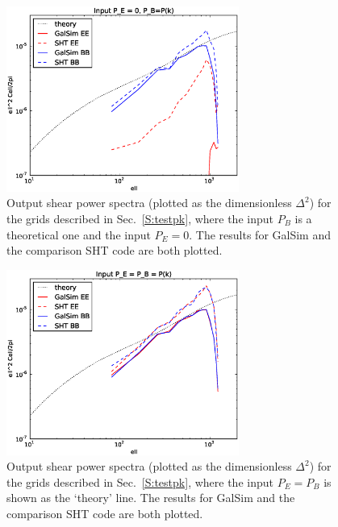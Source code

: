 \documentclass[preprint]{aastex}
\begin{document}
\begin{figure}
\begin{center}
\includegraphics[width=3in]{../external/test_gridshear/output/compare_input_pb.eps}
\caption{Output shear power spectra (plotted as the dimensionless
  $\Delta^2$) for the grids described in Sec.~\ref{S:testpk}, where
  the input $P_B$ is a theoretical one and the input $P_E=0$. The results for GalSim and the
  comparison SHT code are both plotted.\label{F:pb}}
\end{center}
\end{figure}

\begin{figure}
\begin{center}
\includegraphics[width=3in]{../external/test_gridshear/output/compare_input_peb.eps}
\caption{Output shear power spectra (plotted as the dimensionless
  $\Delta^2$) for the grids described in Sec.~\ref{S:testpk}, where
  the input $P_E=P_B$ is shown as the `theory' line. The results for GalSim and the
  comparison SHT code are both plotted.\label{F:peb}}
\end{center}
\end{figure}
\end{document}
